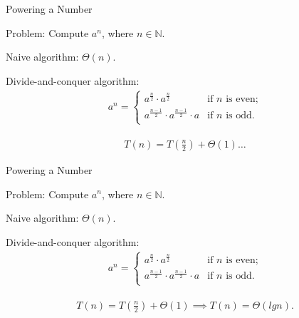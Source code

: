 \documentclass{beamer}
\begin{document}
\begin{frame}{Powering a Number}
    \begin{exampleblock}{Problem:}
        Compute $a^n$, where $n \in \mathbb{N}$.
    \end{exampleblock}
    \begin{exampleblock}{Naive algorithm:}
        $\Theta(n)$.
    \end{exampleblock}
    \begin{exampleblock}{Divide-and-conquer algorithm:}
        \begin{align*}
            a^n =
                \begin{cases}
                    a^{\frac{n}{2}} \cdot a^{\frac{n}{2}} & \text{if $n$ is even;}\\
                    a^{\frac{n - 1}{2}} \cdot a^{\frac{n - 1}{2}} \cdot a & \text{if $n$ is odd.}\\
                \end{cases}
        \end{align*}
    \end{exampleblock}
    \vspace{-5mm}
    \begin{align*}
        T(n) = T(\frac{n}{2}) + \Theta(1) \ldots
    \end{align*}
\end{frame}

\begin{frame}{Powering a Number}
    \begin{exampleblock}{Problem:}
        Compute $a^n$, where $n \in \mathbb{N}$.
    \end{exampleblock}
    \begin{exampleblock}{Naive algorithm:}
        $\Theta(n)$.
    \end{exampleblock}
    \begin{exampleblock}{Divide-and-conquer algorithm:}
        \begin{align*}
            a^n =
                \begin{cases}
                    a^{\frac{n}{2}} \cdot a^{\frac{n}{2}} & \text{if $n$ is even;}\\
                    a^{\frac{n - 1}{2}} \cdot a^{\frac{n - 1}{2}} \cdot a & \text{if $n$ is odd.}\\
                \end{cases}
        \end{align*}
    \end{exampleblock}
    \vspace{-5mm}
    \begin{align*}
        T(n) = T(\frac{n}{2}) + \Theta(1) \implies T(n) = \Theta(lg n) \text{.}
    \end{align*}
\end{frame}
\end{document}
